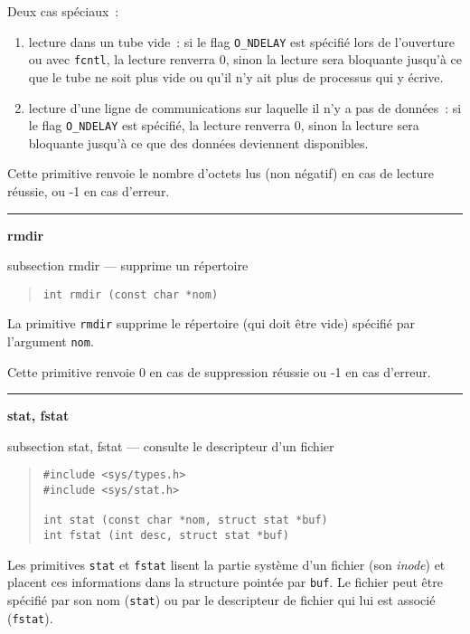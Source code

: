 \documentclass [twoside] {report}
\newcommand {\primitive} [1]
    {
	{\large \bf #1}
	\addcontentsline {toc} {subsection} {#1}
    }
\newcommand {\separation}
    {
	\vspace {7mm}
	\nopagebreak
	\hrule
    }
\begin{document}
Deux cas spéciaux~:

\begin {enumerate}
    \item lecture dans un tube vide~: si le flag {\tt O\_NDELAY}
	est spécifié lors de l'ouverture ou avec {\tt fcntl},
	la lecture renverra 0, sinon la lecture
	sera bloquante jusqu'à ce que le tube ne soit plus
	vide ou qu'il n'y ait plus de processus qui y écrive.
    \item lecture d'une ligne de communications sur
	laquelle il n'y a pas de données~: si le flag {\tt O\_NDELAY}
	est spécifié, la lecture renverra 0, sinon la lecture
	sera bloquante jusqu'à ce que des données
	deviennent disponibles.
\end {enumerate}

Cette primitive renvoie le nombre d'octets lus
(non négatif) en cas de lecture
réussie, ou -1 en cas d'erreur.




\separation
\primitive {rmdir} --- supprime un répertoire

\begin {quote}
\begin {verbatim}
int rmdir (const char *nom)
\end{verbatim}
\end {quote}

La primitive {\tt rmdir} supprime le répertoire (qui doit être vide)
spécifié par l'argument {\tt nom}.

Cette primitive renvoie 0 en cas de suppression réussie
ou -1 en cas d'erreur.




\separation
\primitive {stat, fstat} --- consulte le descripteur d'un fichier

\begin {quote}
\begin {verbatim}
#include <sys/types.h>
#include <sys/stat.h>

int stat (const char *nom, struct stat *buf)
int fstat (int desc, struct stat *buf)
\end{verbatim}
\end {quote}

Les primitives {\tt stat} et {\tt fstat} lisent la partie système d'un
fichier (son {\it inode}) et placent ces informations dans la structure
pointée par {\tt buf}. Le fichier peut être spécifié par son nom
({\tt stat}) ou par le descripteur de fichier qui lui est associé
({\tt fstat}).
\end{document}
